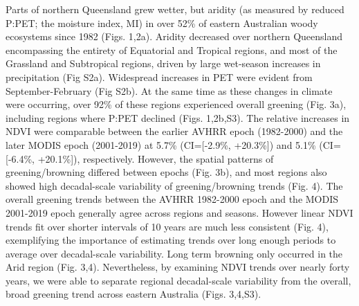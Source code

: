 \documentclass[gc, manuscript]{copernicus}
\begin{document}
Parts of northern Queensland grew wetter, but aridity (as measured by
reduced P:PET; the moisture index, MI) in over 52\% of eastern
Australian woody ecosystems since 1982 (Figs. 1,2a). Aridity decreased
over northern Queensland encompassing the entirety of Equatorial and
Tropical regions, and most of the Grassland and Subtropical regions,
driven by large wet-season increases in precipitation (Fig S2a).
Widespread increases in PET were evident from September-February (Fig
S2b). At the same time as these changes in climate were occurring, over
92\% of these regions experienced overall greening (Fig. 3a), including
regions where P:PET declined (Figs. 1,2b,S3). The relative increases in
NDVI were comparable between the earlier AVHRR epoch (1982-2000) and the
later MODIS epoch (2001-2019) at 5.7\% (CI={[}-2.9\%, +20.3\%{]}) and
5.1\% (CI={[}-6.4\%, +20.1\%{]}), respectively. However, the spatial
patterns of greening/browning differed between epochs (Fig. 3b), and
most regions also showed high decadal-scale variability of
greening/browning trends (Fig. 4). The overall greening trends between
the AVHRR 1982-2000 epoch and the MODIS 2001-2019 epoch generally agree
across regions and seasons. However linear NDVI trends fit over shorter
intervals of 10 years are much less consistent (Fig. 4), exemplifying
the importance of estimating trends over long enough periods to average
over decadal-scale variability. Long term browning only occurred in the
Arid region (Fig. 3,4). Nevertheless, by examining NDVI trends over
nearly forty years, we were able to separate regional decadal-scale
variability from the overall, broad greening trend across eastern
Australia (Figs. 3,4,S3).
\end{document}
